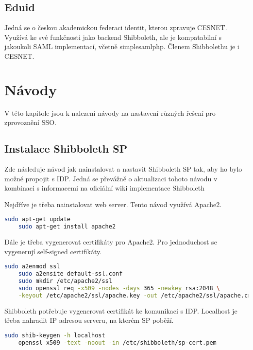 \section{Eduid} %

Jedná se o českou akademickou federaci identit, kterou zpravuje CESNET. 
Využívá ke své funkčnosti jako backend Shibboleth, ale je kompatabilní s jakoukoli SAML implementací, včetně simplesamlphp. Členem Shibbolethu je i CESNET.\cite{eduid}

\chapter{Návody}
\label{návod}

V této kapitole jsou k nalezení návody na nastavení různých řešení pro zprovoznění SSO.

\section{Instalace Shibboleth SP} \label{instalaceShibboleth}

Zde následuje návod jak nainstalovat a nastavit Shibboleth SP tak, aby ho bylo možné propojit s IDP. Jedná se převážně o aktualizaci tohoto návodu\cite{shibbolethSpInstallation} v kombinaci s informacemi na oficiální wiki implementace Shibboleth\cite{shibbolethWikiSP}

Nejdříve je třeba nainstalovat web server. Tento návod využívá Apache2.
\begin{lstlisting}[language=Bash]
    sudo apt-get update
    sudo apt-get install apache2
\end{lstlisting}

Dále je třeba vygenerovat certifikáty pro Apache2. Pro jednoduchost se vygenerují self-signed certifikáty.
\begin{lstlisting}[language=Bash]
    sudo a2enmod ssl
    sudo a2ensite default-ssl.conf
    sudo mkdir /etc/apache2/ssl
    sudo openssl req -x509 -nodes -days 365 -newkey rsa:2048 \
    -keyout /etc/apache2/ssl/apache.key -out /etc/apache2/ssl/apache.crt
\end{lstlisting}

Shibboleth potřebuje vygenerovat certifikát ke komunikaci s IDP. Localhost je třeba nahradit IP adresou serveru, na kterém SP poběží.
\begin{lstlisting}[language=Bash]
    sudo shib-keygen -h localhost
    openssl x509 -text -noout -in /etc/shibboleth/sp-cert.pem
\end{lstlisting}

